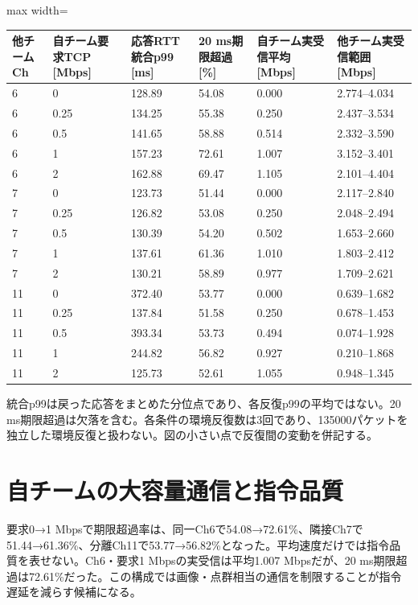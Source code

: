 \documentclass[a4paper,10pt]{ltjsarticle}
\begin{document}
\begin{center}\small\begin{adjustbox}{max width=\linewidth}
\begin{tabular}{llllll}\toprule
他チームCh & 自チーム要求TCP [Mbps] & 応答RTT統合p99 [ms] & 20 ms期限超過 [\%] & 自チーム実受信平均 [Mbps] & 他チーム実受信範囲 [Mbps]\\
\midrule
6 & 0 & 128.89 & 54.08 & 0.000 & 2.774–4.034\\
6 & 0.25 & 134.25 & 55.38 & 0.250 & 2.437–3.534\\
6 & 0.5 & 141.65 & 58.88 & 0.514 & 2.332–3.590\\
6 & 1 & 157.23 & 72.61 & 1.007 & 3.152–3.401\\
6 & 2 & 162.88 & 69.47 & 1.105 & 2.101–4.404\\
7 & 0 & 123.73 & 51.44 & 0.000 & 2.117–2.840\\
7 & 0.25 & 126.82 & 53.08 & 0.250 & 2.048–2.494\\
7 & 0.5 & 130.39 & 54.20 & 0.502 & 1.653–2.660\\
7 & 1 & 137.61 & 61.36 & 1.010 & 1.803–2.412\\
7 & 2 & 130.21 & 58.89 & 0.977 & 1.709–2.621\\
11 & 0 & 372.40 & 53.77 & 0.000 & 0.639–1.682\\
11 & 0.25 & 137.84 & 51.58 & 0.250 & 0.678–1.453\\
11 & 0.5 & 393.34 & 53.73 & 0.494 & 0.074–1.928\\
11 & 1 & 244.82 & 56.82 & 0.927 & 0.210–1.868\\
11 & 2 & 125.73 & 52.61 & 1.055 & 0.948–1.345\\
\bottomrule\end{tabular}\end{adjustbox}\end{center}

統合p99は戻った応答をまとめた分位点であり、各反復p99の平均ではない。20 ms期限超過は欠落を含む。各条件の環境反復数は3回であり、135000パケットを独立した環境反復と扱わない。図の小さい点で反復間の変動を併記する。

\section{自チームの大容量通信と指令品質}

要求0→1 Mbpsで期限超過率は、同一Ch6で54.08→72.61\%、隣接Ch7で51.44→61.36\%、分離Ch11で53.77→56.82\%となった。平均速度だけでは指令品質を表せない。Ch6・要求1 Mbpsの実受信は平均1.007 Mbpsだが、20 ms期限超過は72.61\%だった。この構成では画像・点群相当の通信を制限することが指令遅延を減らす候補になる。
\end{document}
